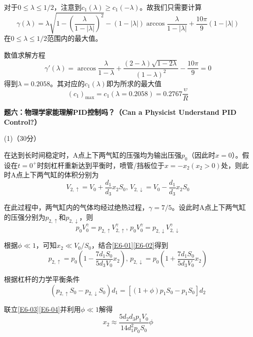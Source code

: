 \documentclass[10pt,a4paper,onecolumn,UTF8]{ctexart}
\begin{document}
	对于$0\leq\lambda\leq1/2$，注意到$c_1(\lambda)\geq c_1(-\lambda)$。故我们只需要计算
	$$\gamma(\lambda)=\lambda\sqrt{1-\left(\frac{\lambda}{1-|\lambda|}\right)^2}-(1-|\lambda|)\arccos\frac{\lambda}{1-|\lambda|}+\frac{10\pi}{9}(1-|\lambda|)$$
	在$0\leq\lambda\leq1/2$范围内的最大值。
	
	数值求解方程
	$$\gamma'(\lambda)=\arccos\frac{\lambda}{1-\lambda}+\frac{(2-\lambda)\sqrt{1-2\lambda}}{(1-\lambda)^2}-\frac{10\pi}{9}=0$$
	得到$\lambda=0.2058$。其对应的$c_1(\lambda)$即为所求的最大值
	\begin{equation}
		(c_1)_{\max}=c_1(\lambda=0.2058)=0.2767\frac{\upsilon}{R}
	\end{equation}
	
	
	\setcounter{equation}{0}
	\newpage
	
	\noindent
	\textbf{题六：物理学家能理解PID控制吗？（Can a Physicist Understand PID Control?）}
	
	(1)（30分）
	
	在达到长时间稳定时，A点上下两气缸的压强均为输出压强$p_0$（因此时$x=0$）。假设在$t=0^+$时刻杠杆重新达到平衡时，喷管/挡板位于$x=-x_2(x_2>0)$处，则此时A点上下两气缸的体积分别为
	\begin{equation}\label{E6-01}
		V_{2,\uparrow}=V_0+\frac{d_1}{d_3}x_2S_0,\,V_{2,\downarrow}=V_0-\frac{d_1}{d_3}x_2S_0
	\end{equation}
	
	在此过程中，两气缸内的气体均经过绝热过程，$\gamma=7/5$。设此时A点上下两气缸的压强分别为$p_{2,\uparrow}$和$p_{2,\downarrow}$，则
	\begin{equation}\label{E6-02}
		p_0V_0^{\gamma}=p_{2,\uparrow}V^{\gamma}_{2,\uparrow},\,p_0V_0^{\gamma}=p_{2,\downarrow}V^{\gamma}_{2,\downarrow}
	\end{equation}
	
	根据$\phi\ll1$，可知$x_2\ll V_0/S_0$，结合\eqref{E6-01}\eqref{E6-02}得到
	\begin{equation}\label{E6-03}
		p_{2,\uparrow}=p_0\left(1-\frac{7d_1S_0}{5d_3V_0}x_2\right),\,p_{2,\downarrow}=p_0\left(1+\frac{7d_1S_0}{5d_3V_0}x_2\right)
	\end{equation}
	
	根据杠杆的力学平衡条件
	\begin{equation}\label{E6-04}
		(p_{2,\uparrow}S_0-p_{2,\downarrow}S_0)d_1=[(1+\phi)p_1S_0-p_1S_0]d_2
	\end{equation}
	
	联立\eqref{E6-03}\eqref{E6-04}并利用$\phi\ll1$解得
	\begin{equation}\label{E6-05}
		x_2\approx\frac{5d_2d_3p_1V_0}{14d_1^2p_0S_0}\phi
	\end{equation}
	
\end{document}
